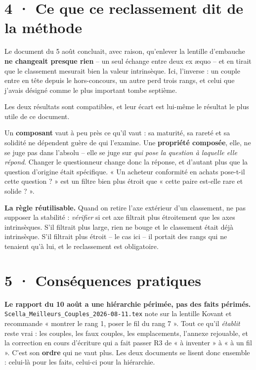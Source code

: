 \documentclass[10pt]{article}
\newcommand{\code}[1]{\texttt{\small #1}}
\begin{document}
\section{4 · Ce que ce reclassement dit de la méthode}

Le document du 5 août concluait, avec raison, qu'enlever la lentille d'embauche \textbf{ne changeait
presque rien} -- un seul échange entre deux ex \ae quo -- et en tirait que le classement mesurait bien
la valeur intrinsèque. Ici, l'inverse : un couple entre en tête depuis le hors-concours, un autre perd
trois rangs, et celui que j'avais désigné comme le plus important tombe septième.

Les deux résultats sont compatibles, et leur écart est lui-même le résultat le plus utile de ce
document.

Un \textbf{composant} vaut à peu près ce qu'il vaut : sa maturité, sa rareté et sa solidité ne
dépendent guère de qui l'examine. Une \textbf{propriété composée}, elle, ne se juge pas dans l'absolu
-- elle se juge sur \emph{qui pose la question à laquelle elle répond}. Changer le questionneur change
donc la réponse, et d'autant plus que la question d'origine était spécifique. « Un acheteur conformité
en achats pose-t-il cette question ? » est un filtre bien plus étroit que « cette paire est-elle rare
et solide ? ».

\begin{acquis}
\textbf{La règle réutilisable.} Quand on retire l'axe extérieur d'un classement, ne pas supposer la
stabilité : \emph{vérifier} si cet axe filtrait plus étroitement que les axes intrinsèques. S'il
filtrait plus large, rien ne bouge et le classement était déjà intrinsèque. S'il filtrait plus étroit
-- le cas ici -- il portait des rangs qui ne tenaient qu'à lui, et le reclassement est obligatoire.
\end{acquis}

\section{5 · Conséquences pratiques}

\textbf{Le rapport du 10 août a une hiérarchie périmée, pas des faits périmés.}
\code{Scella\_Meilleurs\_Couples\_2026-08-11.tex} note sur la lentille Kovant et recommande « montrer
le rang 1, poser le fil du rang 7 ». Tout ce qu'il \emph{établit} reste vrai : les couples, les faux
couples, les emplacements, l'annexe rejouable, et la correction en cours d'écriture qui a fait passer
R3 de « à inventer » à « à un fil ». C'est son \textbf{ordre} qui ne vaut plus. Les deux documents se
lisent donc ensemble : celui-là pour les faits, celui-ci pour la hiérarchie.
\end{document}
